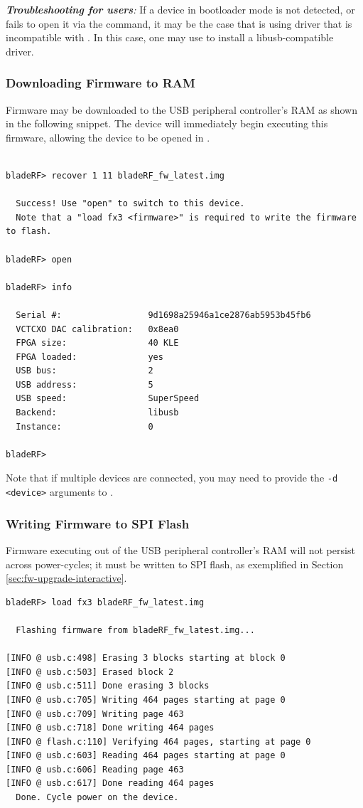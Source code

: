 \textit{\textbf{Troubleshooting for \windows users}:}
If a device in bootloader mode is not detected, or \bladerfcli fails to open it
via the  command, it may be the case that \windows is using driver
that is incompatible with \bladerfcli. In this case, one may use 
 \cite{ZADIG} to install a libusb-compatible driver.

\subsubsection{Downloading Firmware to RAM}
Firmware may be downloaded to the USB peripheral controller's RAM as shown in the
following snippet.  The device will immediately begin executing this firmware,
allowing the device to be opened in \bladerfcli.

{
\noindent\minipage{\linewidth}\medskip
\begin{lstlisting}[style=snippet]

bladeRF> recover 1 11 bladeRF_fw_latest.img

  Success! Use "open" to switch to this device.
  Note that a "load fx3 <firmware>" is required to write the firmware to flash.

bladeRF> open

bladeRF> info

  Serial #:                 9d1698a25946a1ce2876ab5953b45fb6
  VCTCXO DAC calibration:   0x8ea0
  FPGA size:                40 KLE
  FPGA loaded:              yes
  USB bus:                  2
  USB address:              5
  USB speed:                SuperSpeed
  Backend:                  libusb
  Instance:                 0

bladeRF>
\end{lstlisting}
\endminipage
}

Note that if multiple devices are connected, you may need to provide the
\texttt{-d <device>} arguments to \bladerfcli. \\

\subsubsection{Writing Firmware to SPI Flash}
Firmware executing out of the USB peripheral controller's RAM will not 
persist across power-cycles; it must be written to SPI flash, as exemplified
in Section \ref{sec:fw-upgrade-interactive}. \\

\begin{lstlisting}[style=snippet]
bladeRF> load fx3 bladeRF_fw_latest.img

  Flashing firmware from bladeRF_fw_latest.img...

[INFO @ usb.c:498] Erasing 3 blocks starting at block 0
[INFO @ usb.c:503] Erased block 2
[INFO @ usb.c:511] Done erasing 3 blocks
[INFO @ usb.c:705] Writing 464 pages starting at page 0
[INFO @ usb.c:709] Writing page 463
[INFO @ usb.c:718] Done writing 464 pages
[INFO @ flash.c:110] Verifying 464 pages, starting at page 0
[INFO @ usb.c:603] Reading 464 pages starting at page 0
[INFO @ usb.c:606] Reading page 463
[INFO @ usb.c:617] Done reading 464 pages
  Done. Cycle power on the device.
\end{lstlisting}


